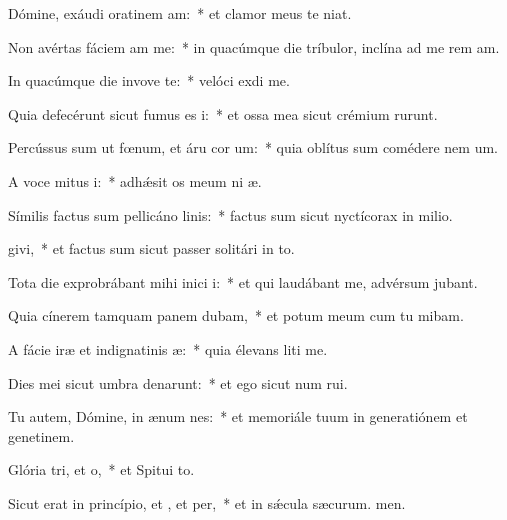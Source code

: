 \item Dómine, exáudi oratinem am:~* et clamor meus  te niat.
\item Non avértas fáciem am  me:~* in quacúmque die tríbulor, inclína ad me rem am.
\item In quacúmque die invove te:~* velóci exdi me.
\item Quia defecérunt sicut fumus es i:~* et ossa mea sicut crémium rurunt.
\item Percússus sum ut fœnum, et áru cor um:~* quia oblítus sum comédere nem um.
\item A voce mitus i:~* adhǽsit os meum ni æ.
\item Símilis factus sum pellicáno linis:~* factus sum sicut nyctícorax in milio.
\item {}givi,~* et factus sum sicut passer solitári in to.
\item Tota die exprobrábant mihi inici i:~* et qui laudábant me, advérsum  jubant.
\item Quia cínerem tamquam panem dubam,~* et potum meum cum tu mibam.
\item A fácie iræ et indignatinis æ:~* quia élevans liti me.
\item Dies mei sicut umbra denarunt:~* et ego sicut num rui.
\item Tu autem, Dómine, in ænum nes:~* et memoriále tuum in generatiónem et genetinem.
\item Glória tri, et o,~* et Spitui to.
\item Sicut erat in princípio, et , et per,~* et in sǽcula sæcurum. men.
